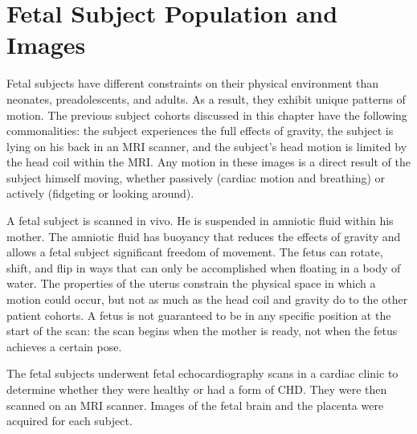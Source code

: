 
\section{Fetal Subject Population and Images}

Fetal subjects have different constraints on their physical environment than neonates, preadolescents, and adults. As a result, they exhibit unique patterns of motion. The previous subject cohorts discussed in this chapter have the following commonalities: the subject experiences the full effects of gravity, the subject is lying on his back in an MRI scanner, and the subject's head motion is limited by the head coil within the MRI. Any motion in these images is a direct result of the subject himself moving, whether passively (cardiac motion and breathing) or actively (fidgeting or looking around).

A fetal subject is scanned in vivo. He is suspended in amniotic fluid within his mother. The amniotic fluid has buoyancy that reduces the effects of gravity and allows a fetal subject significant freedom of movement. The fetus can rotate, shift, and flip in ways that can only be accomplished when floating in a body of water. The properties of the uterus constrain the physical space in which a motion could occur, but not as much as the head coil and gravity do to the other patient cohorts. A fetus is not guaranteed to be in any specific position at the start of the scan: the scan begins when the mother is ready, not when the fetus achieves a certain pose. 

The fetal subjects underwent fetal echocardiography scans in a cardiac clinic to determine whether they were healthy or had a form of CHD. They were then scanned on an MRI scanner. Images of the fetal brain and the placenta were acquired for each subject. 

